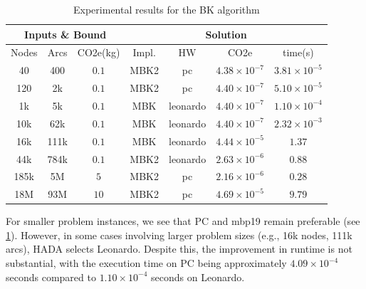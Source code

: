 \documentclass[a4paper,singleside,12pt]{report} %
\begin{document}
\begin{table}[h!]
    \centering
    \begin{tabular}{|ccc|cccc|}
        \hline
        \multicolumn{3}{|c|}{Inputs \& Bound} & \multicolumn{4}{c|}{Solution} \\
        \hline
        Nodes & Arcs & CO2e(kg) & Impl. & HW & CO2e & time(s) \\
        \hline
        40 & 400 & $0.1$ & MBK2 & pc & $4.38 \times 10^{-7}$ & $3.81 \times 10^{-5}$ \\
        120 & 2k & $0.1$ & MBK2 & pc & $4.40 \times 10^{-7}$ & $5.10 \times 10^{-5}$ \\
        1k & 5k & $0.1$ & MBK & leonardo & $4.40 \times 10^{-7}$ & $1.10 \times 10^{-4}$ \\
        10k & 62k & $0.1$ & MBK & leonardo & $4.40 \times 10^{-7}$ & $2.32 \times 10^{-3}$ \\
        16k & 111k & $0.1$ & MBK & leonardo & $4.44 \times 10^{-5}$ & $1.37$ \\
        44k & 784k & $0.1$ & MBK2 & leonardo & $2.63 \times 10^{-6}$ & $0.88$ \\
        185k & 5M & $5$ & MBK2 & pc & $2.16 \times 10^{-6}$ & $0.28$ \\
        18M & 93M & $10$ & MBK2 & pc & $4.69 \times 10^{-5}$& $9.79$ \\
        \hline
    \end{tabular}
    \caption{Experimental results for the BK algorithm}
    \label{tab:bk_results_time}
\end{table}

For smaller problem instances, we see that PC and mbp19 remain preferable (see \ref{tab:bk_results_time}). However, in some cases involving larger problem sizes (e.g., 16k nodes, 111k arcs), HADA selects Leonardo. 
Despite this, the improvement in runtime is not substantial, with the execution time on PC being approximately $4.09 \times 10^{-4}$ seconds compared to $1.10 \times 10^{-4}$ 
seconds on Leonardo.
\end{document}
